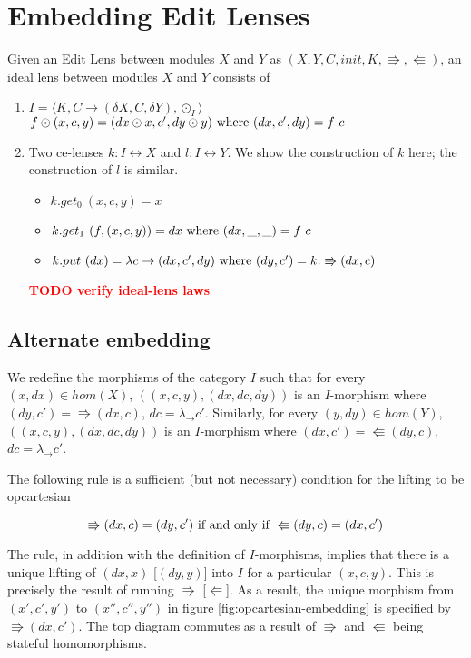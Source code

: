 \documentclass[a4paper,10pt]{article}
\newcommand{\finish}[1]{#1}
\newcommand{\comment}[1]{\finish{\textbf{\textcolor{red}{#1}}}}
\begin{document}
\section{Embedding Edit Lenses}
Given an Edit Lens between modules $X$ and $Y$ as $(X,Y,C,init,K,\Rrightarrow,\Lleftarrow)$, an ideal lens between modules $X$ and $Y$ consists of
\begin{enumerate}

\item $I = \langle K, C \to (\delta X, C, \delta Y), \odot_I \rangle$ \\
      $f \odot (x, c, y) = (dx \odot x, c', dy \odot y) \textnormal{ where } (dx, c', dy) = f~c $ \\
\item Two ce-lenses $k: I \leftrightarrow X$ and $l : I \leftrightarrow Y$. We show the construction of $k$ here; the construction of $l$ is similar.
  \begin{itemize}
   \item $k.get_0~(x,c,y) = x$
   \item $k.get_1~(f, (x,c,y)) = dx \textnormal{ where } (dx, \_, \_) = f~c$
   \item $k.put~(dx) = \lambda c \to (dx, c', dy) \textnormal{ where } (dy, c') = k.\Rrightarrow(dx, c)$
  \end{itemize}
  
\comment{TODO verify ideal-lens laws}

\end{enumerate}

\subsection{Alternate embedding}
  We redefine the morphisms of the category $I$ such that for every $(x, dx) \in hom(X)$, $((x,c,y),(dx,dc,dy))$ is an $I$-morphism where $(dy,c') = \Rrightarrow (dx,c)$, $dc = \lambda _ \to c'$.
  Similarly, for every $(y, dy) \in hom(Y)$, $((x,c,y),(dx,dc,dy))$ is an $I$-morphism where $(dx,c') = \Lleftarrow (dy,c)$, $dc = \lambda _ \to c'$. 
  
  The following rule is a sufficient (but not necessary) condition for the lifting to be opcartesian
  
  \[ \Rrightarrow (dx,c) = (dy, c') \textnormal{ if and only if } \Lleftarrow (dy, c) = (dx, c') \]

  The rule, in addition with the definition of $I$-morphisms, implies that there is a unique lifting of $(dx, x)$ [$(dy, y)$] into $I$ for a particular $(x,c,y)$. This is precisely the result of running $\Rrightarrow$ [$\Lleftarrow$]. As a result, the unique morphism from $(x',c',y')$ to $(x'',c'',y'')$ in figure \ref{fig:opcartesian-embedding} is specified by $\Rrightarrow (dx, c')$. The top diagram commutes as a result of $\Rrightarrow$ and $\Lleftarrow$ being stateful homomorphisms.
  
\end{document}
